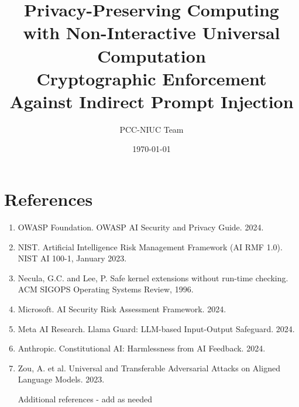 \documentclass[11pt]{article}
\title{Privacy-Preserving Computing with Non-Interactive Universal Computation\\\large Cryptographic Enforcement Against Indirect Prompt Injection}
\author{PCC-NIUC Team}
\date{\today}
\begin{document}
\maketitle





\section*{References}
\begin{enumerate}
\item OWASP Foundation. OWASP AI Security and Privacy Guide. 2024.
\item NIST. Artificial Intelligence Risk Management Framework (AI RMF 1.0). NIST AI 100-1, January 2023.
\item Necula, G.C. and Lee, P. Safe kernel extensions without run-time checking. ACM SIGOPS Operating Systems Review, 1996.
\item Microsoft. AI Security Risk Assessment Framework. 2024.
\item Meta AI Research. Llama Guard: LLM-based Input-Output Safeguard. 2024.
\item Anthropic. Constitutional AI: Harmlessness from AI Feedback. 2024.
\item Zou, A. et al. Universal and Transferable Adversarial Attacks on Aligned Language Models. 2023.
\item [Additional references - add as needed]
\end{enumerate}
\end{document}
